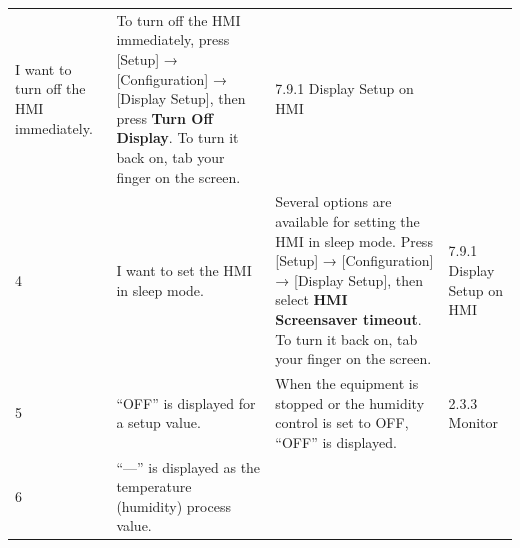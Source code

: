 \begin{longtable}[]{@{}llll@{}}
\begin{minipage}[t]{0.30\columnwidth}
I want to turn off the HMI immediately.\strut
\end{minipage} & \begin{minipage}[t]{0.33\columnwidth}\raggedright
To turn off the HMI immediately, press {[}Setup{]} → {[}Configuration{]}
→ {[}Display Setup{]}, then press \textbf{Turn Off Display}. To turn it
back on, tab your finger on the screen.\strut
\end{minipage} & \begin{minipage}[t]{0.17\columnwidth}\raggedright
7.9.1 Display Setup on HMI\strut
\end{minipage}\tabularnewline
\begin{minipage}[t]{0.08\columnwidth}\raggedright
4\strut
\end{minipage} & \begin{minipage}[t]{0.30\columnwidth}\raggedright
I want to set the HMI in sleep mode.\strut
\end{minipage} & \begin{minipage}[t]{0.33\columnwidth}\raggedright
Several options are available for setting the HMI in sleep mode. Press
{[}Setup{]} → {[}Configuration{]} → {[}Display Setup{]}, then select
\textbf{HMI Screensaver timeout}. To turn it back on, tab your finger on
the screen.\strut
\end{minipage} & \begin{minipage}[t]{0.17\columnwidth}\raggedright
7.9.1 Display Setup on HMI\strut
\end{minipage}\tabularnewline
\begin{minipage}[t]{0.08\columnwidth}\raggedright
5\strut
\end{minipage} & \begin{minipage}[t]{0.30\columnwidth}\raggedright
``OFF'' is displayed for a setup value.\strut
\end{minipage} & \begin{minipage}[t]{0.33\columnwidth}\raggedright
When the equipment is stopped or the humidity control is set to OFF,
``OFF'' is displayed.\strut
\end{minipage} & \begin{minipage}[t]{0.17\columnwidth}\raggedright
2.3.3 Monitor\strut
\end{minipage}\tabularnewline
\begin{minipage}[t]{0.08\columnwidth}\raggedright
6\strut
\end{minipage} & \begin{minipage}[t]{0.30\columnwidth}\raggedright
``---'' is displayed as the temperature (humidity) process value.\strut

\end{minipage}
\end{longtable}
